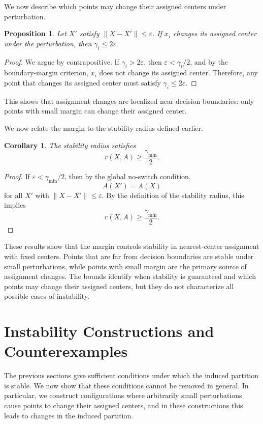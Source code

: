 \documentclass[11pt]{amsart}
\theoremstyle{plain}
\newtheorem{proposition}[subsection]{Proposition}
\newtheorem{corollary}[subsection]{Corollary}
\theoremstyle{definition}
\begin{document}
We now describe which points may change their assigned centers under perturbation.

\begin{proposition}
Let $X'$ satisfy $\|X - X'\| \le \varepsilon$. If $x_i$ changes its assigned center under the perturbation, then
$\gamma_i \le 2\varepsilon.$
\end{proposition}

\begin{proof}
We argue by contrapositive. If $\gamma_i > 2\varepsilon$, then $\varepsilon < \gamma_i/2$, and by the boundary-margin criterion, $x_i$ does not change its assigned center. Therefore, any point that changes its assigned center must satisfy $\gamma_i \le 2\varepsilon$.
\end{proof}

This shows that assignment changes are localized near decision boundaries: only points with small margin can change their assigned center.

We now relate the margin to the stability radius defined earlier.

\begin{corollary}
The stability radius satisfies
\[
r(X, A) \ge \frac{\gamma_{\min}}{2}.
\]
\end{corollary}

\begin{proof}
If $\varepsilon < \gamma_{\min}/2$, then by the global no-switch condition,
\[
A(X') = A(X)
\]
for all $X'$ with $\|X - X'\| \le \varepsilon$. By the definition of the stability radius, this implies
\[
r(X, A) \ge \frac{\gamma_{\min}}{2}.
\]
\end{proof}

These results show that the margin controls stability in nearest-center assignment with fixed centers. Points that are far from decision boundaries are stable under small perturbations, while points with small margin are the primary source of assignment changes. The bounds identify when stability is guaranteed and which points may change their assigned centers, but they do not characterize all possible cases of instability.






\section{Instability Constructions and Counterexamples}

The previous sections give sufficient conditions under which the induced partition is stable. We now show that these conditions cannot be removed in general. In particular, we construct configurations where arbitrarily small perturbations cause points to change their assigned centers, and in these constructions this leads to changes in the induced partition.
\end{document}
